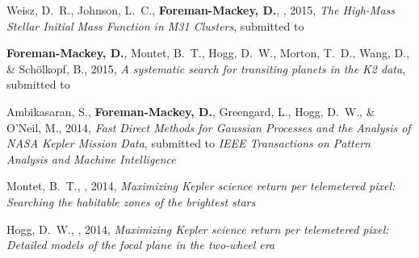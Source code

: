 \item Weisz, D.~R., Johnson, L.~C., {\bf Foreman-Mackey, D.}, \etal, 2015,
    \emph{The High-Mass Stellar Initial Mass Function in M31 Clusters},
    submitted to \apj\ 

\item {\bf Foreman-Mackey, D.}, Montet, B.~T., Hogg, D.~W., Morton, T.~D.,
    Wang, D., \& Sch\"olkopf, B., 2015,
    \emph{A systematic search for transiting planets in the K2 data},
    submitted to \apj\ 

\item Ambikasaran, S., {\bf Foreman-Mackey, D.}, Greengard, L., Hogg, D.~W.,
    \& O'Neil, M., 2014,
    \emph{Fast Direct Methods for Gaussian Processes and the Analysis of NASA
          Kepler Mission Data},
    submitted to \emph{IEEE Transactions on Pattern Analysis and Machine
        Intelligence}

\item Montet, B.~T., \etal, 2014,
    \emph{Maximizing Kepler science return per telemetered pixel: Searching
          the habitable zones of the brightest stars}

\item Hogg, D.~W., \etal, 2014,
    \emph{Maximizing Kepler science return per telemetered pixel: Detailed
          models of the focal plane in the two-wheel era}
